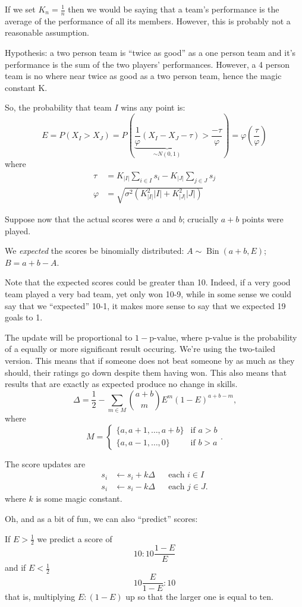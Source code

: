 \documentclass{article}
\begin{document}
If we set $K_n = \frac{1}{n}$ then we would be saying that a team's performance is the average of the performance of all its members. However, this is probably not a reasonable assumption.

Hypothesis: a two person team is ``twice as good'' as a one person team and it's performance is the sum of the two players' performances. However, a 4 person team is no where near twice as good as a two person team, hence the magic constant K. 

So, the probability that team $I$ wins any point is:
\[
    E = P( X_I > X_J ) = P\left( \underbrace{ \frac{1}{\varphi} ( X_I - X_J - \tau ) }_{\sim N(0, 1)}
                                 > \frac{-\tau}{\varphi} \right)
                       = \varphi\left( \frac{\tau}{\varphi} \right)
\]
where
\begin{align*}
    \tau &= K_{|I|} \sum_{i \in I} s_i - K_{|J|} \sum_{j \in J} s_j \\
    \varphi &= \sqrt{ \sigma^2 ( K_{|I|}^2 |I| + K_{|J|}^2 |J| ) }
\end{align*}

Suppose now that the actual scores were $a$ and $b$; crucially $a + b$ points were played.

We {\it expected} the scores be binomially distributed: $A\sim\operatorname{Bin}(a + b, E)$; $B = a + b - A$.

Note that the expected scores could be greater than 10. Indeed, if a very good team played a very bad team, yet only won 10-9, while in some sense we could say that we ``expected'' 10-1, it makes more sense to say that we expected 19 goals to 1.

The update will be proportional to $1 - \text{p-value}$, where $\text{p-value}$ is the probability of a equally or more significant result occuring. We're using the two-tailed version. This means that if someone does not beat someone by as much as they should, their ratings go down despite them having won. This also means that results that are exactly as expected produce no change in skills.
\[
    \Delta = \frac{1}{2} - \sum_{m \in M} {a + b \choose m} E^m (1 - E)^{a + b - m}
    \text{,}
\]
where
\[
    M = \begin{cases}
        \{ a, a + 1, \ldots, a + b \}  &\text{if } a > b \\
        \{ a, a - 1, \ldots, 0 \}      &\text{if } b > a
    \end{cases}
    \text{.}
\]

The score updates are
\begin{align*}
    s_i &\leftarrow s_i + k \Delta && \text{each } i \in I \\
    s_i &\leftarrow s_i - k \Delta && \text{each } j \in J
    \text{.}
\end{align*}
where $k$ is some magic constant.


Oh, and as a bit of fun, we can also ``predict'' scores:

If $E > \frac{1}{2}$ we predict a score of
\[
    10 : 10 \frac{1 - E}{E}
\]
and if $E < \frac{1}{2}$
\[
    10 \frac{E}{1 - E} : 10
\]
that is, multiplying $E : (1 - E)$ up so that the larger one is equal to ten.
\end{document}
